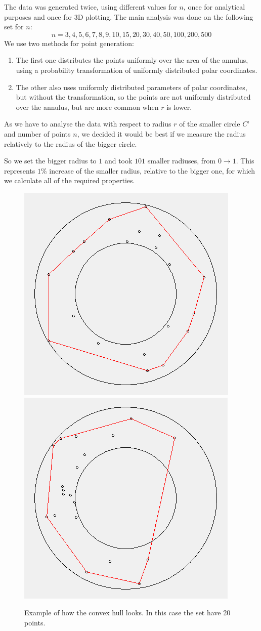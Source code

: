 \documentclass[12pt,a4paper]{article}
\begin{document}
The data was generated twice, using different values for $n$, once for analytical purposes and once for 3D plotting. The main analysis was done on the following set for $n$:
$$n= 3,4,5,6,7,8,9,10,15,20,30,40,50,100,200,500$$
We use two methods for point generation:
\begin{enumerate}
 \item The first one distributes the points uniformly over the area of the annulus, using a probability transformation of uniformly distributed polar coordinates.
 \item The other also uses uniformly distributed parameters of polar coordinates, but without the transformation, so the points are not uniformly distributed over the annulus, but are more common when $r$ is lower.
 \end{enumerate} 


As we have to analyse the data with respect to radius $r$ of the smaller circle $C’$ and number of points $n$, we decided it would be best if we measure the radius relatively to the radius of the bigger circle.

So we set the bigger radius to $1$ and took $101$ smaller radiuses, from $0\to 1$. This represents $1\%$ increase of the smaller radius, relative to the bigger one, for which we calculate all of the required properties. \medskip

\begin{figure}[H]
 \centering
  {
   \label{f:graph1}
    \includegraphics[width=0.3 \textwidth]{../graphs/convex_hull1.png}} \hspace{25mm}
  {
   \label{f:graph2}
    \includegraphics[width=0.3  \textwidth]{../graphs/convex_hull2.png}}
 \caption{Example of how the convex hull looks. In this case the set have 20 points.}
 \label{f:graphs}
\end{figure}
\end{document}
